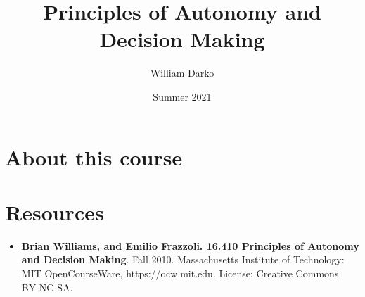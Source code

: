 \documentclass[12pt, a4paper]{article}
\title{Principles of Autonomy and Decision Making}
\author{William Darko}
\date{Summer 2021}
\begin{document}
\maketitle
\newpage

\tableofcontents

\newpage

\section{About this course}
\paragraph*{}



\newpage

\section{Resources}

\begin{itemize}
   \item \textbf{Brian Williams, and Emilio Frazzoli. 16.410 Principles of Autonomy and Decision Making}. 
   Fall 2010. Massachusetts Institute of Technology: MIT OpenCourseWare, 
   https://ocw.mit.edu. License: Creative Commons BY-NC-SA.
\end{itemize}

\newpage
\end{document}
